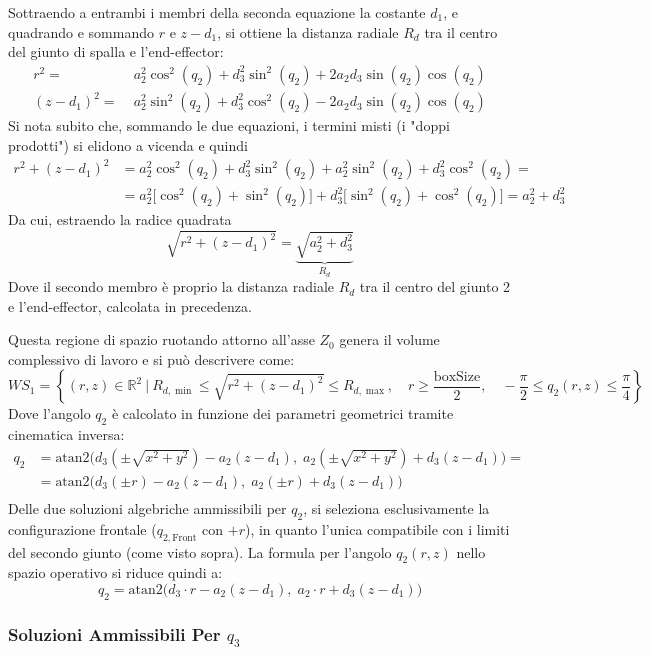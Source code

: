 ﻿\documentclass[11pt, a4paper]{article}
\begin{document}
Sottraendo a entrambi i membri della seconda equazione la costante $d_1$, e quadrando e sommando $r$ e $z - d_1$, si ottiene la distanza radiale $R_d$ tra il centro del giunto di spalla e l'end-effector:
\begin{align*}
  r^2 =& \; a_2^2 \cos^2(q_2) + d_3^2 \sin^2(q_2) + 2 a_2 d_3 \sin(q_2) \cos(q_2)\\
  (z - d_1)^2 =& \; a_2^2 \sin^2(q_2) + d_3^2 \cos^2(q_2) - 2 a_2 d_3 \sin(q_2) \cos(q_2)
\end{align*}
Si nota subito che, sommando le due equazioni, i termini misti (i "doppi prodotti") si elidono a vicenda e quindi
\begin{align*}
  r^2 + (z - d_1)^2 &= a_2^2 \cos^2(q_2) + d_3^2 \sin^2(q_2) + a_2^2 \sin^2(q_2) + d_3^2 \cos^2(q_2) =\\
  &= a_2^2 \bigl[\cos^2(q_2) + \sin^2(q_2)\bigr] + d_3^2 \bigl[\sin^2(q_2) + \cos^2(q_2)\bigr] = a_2^2 + d_3^2
\end{align*}
Da cui, estraendo la radice quadrata
\[
  \sqrt{r^2 + (z - d_1)^2} = \underbrace{\sqrt{a_2^2 + d_3^2}}_{R_d}
\]
Dove il secondo membro è proprio la distanza radiale $R_d$ tra il centro del giunto 2 e l'end-effector, calcolata in precedenza.

Questa regione di spazio ruotando attorno all'asse $Z_0$ genera il volume complessivo di lavoro e si può descrivere come:
\[
  WS_1 = \left\{ (r, z) \in \mathbb{R}^2 \ \Big|\ R_{d,\min} \le \sqrt{r^2 + (z - d_1)^2} \le R_{d,\max}, \quad r \ge \frac{\text{boxSize}}{2}, \quad -\frac{\pi}{2} \le q_2(r, z) \le \frac{\pi}{4} \right\}
\]
Dove l'angolo $q_{2}$ è calcolato in funzione dei parametri geometrici tramite cinematica inversa:
\begin{align*}
  q_2 &= \text{atan2}\biggl(d_{3} (\pm \sqrt{x^2+y^2}) - a_{2} (z - d_1), \; a_{2} (\pm \sqrt{x^2+y^2}) + d_{3} (z - d_1)\biggr) =\\
  &= \text{atan2}\biggl(d_{3} (\pm r) - a_{2} (z - d_1), \; a_{2} (\pm r) + d_{3} (z - d_1)\biggr)\\
\end{align*}
Delle due soluzioni algebriche ammissibili per $q_2$, si seleziona esclusivamente la configurazione frontale ($q_{2,\text{Front}}$ con $+r$), in quanto l'unica compatibile con i limiti del secondo giunto (come visto sopra). La formula per l'angolo $q_2(r, z)$ nello spazio operativo si riduce quindi a:
\[
  q_2 = \text{atan2}\biggl(d_{3} \cdot r - a_{2} (z - d_1), \; a_{2} \cdot r + d_{3} (z - d_1)\biggr)
\]

\subsubsection*{Soluzioni Ammissibili Per $q_3$}
\end{document}
